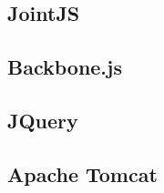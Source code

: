 
\subsection{JointJS}

\subsection{Backbone.js}

\subsection{JQuery}

\subsection{Apache Tomcat}




